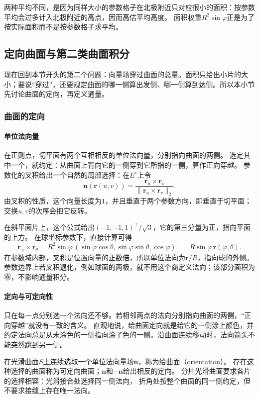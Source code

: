两种平均不同，是因为同样大小的参数格子在北极附近只对应很小的面积：按参数平均会过多计入北极附近的高点，因而高估平均高度。
面积权重$R^2\sin\varphi$正是为了按实际面积而不是按参数格子求平均。

\subsection{定向曲面与第二类曲面积分}

现在回到本节开头的第二个问题：向量场穿过曲面的总量。面积只给出小片的大小；要说“穿过”，还要规定曲面的哪一侧算出发侧、哪一侧算到达侧。所以本小节先讨论曲面的定向，再定义通量。

\subsubsection{曲面的定向}

\paragraph{单位法向量}

在正则点，切平面有两个互相相反的单位法向量，分别指向曲面的两侧。
选定其中一个，就约定：从曲面上背向它的一侧穿到它所指的一侧，算作正向穿越。
参数化的叉积给出一个自然的局部选择：在$E^\circ$上令
\[
 \bm n(\bm r(u,v))
 =\frac{\bm r_u\times\bm r_v}{\lVert\bm r_u\times\bm r_v\rVert_2}.
\]
由叉积的性质，这个向量长度为$1$，并且垂直于两个参数方向，即垂直于切平面；交换$u,v$的次序会把它反转。

在斜平面片上，这个公式给出$(-1,-1,1)^\top/\sqrt3$，它的第三分量为正，指向平面的上方。
在球坐标参数下，直接计算可得
\[
 \bm r_\varphi\times\bm r_\theta
 =R^2\sin\varphi\,(\sin\varphi\cos\theta,\sin\varphi\sin\theta,\cos\varphi)^\top
 =R\sin\varphi\,\bm r(\varphi,\theta).
\]
在参数域内部，叉积是位置向量的正数倍，所以单位法向为$\bm r/R$，指向球的外侧。
参数边界上若叉积退化，例如球面的两极，就不用这个商定义法向；该部分面积为零，不影响通量积分。

\paragraph{定向与可定向性}

只在每一点分别选一个法向还不够。若相邻两点的法向分别指向曲面的两侧，“正向穿越”就没有一致的含义。
直观地说，给曲面定向就是给它的一侧涂上颜色，并约定法向总是从未涂色的一侧指向涂了色的一侧。沿曲面连续移动时，法向箭头不能突然跳到另一侧。

\begin{definition}[曲面的定向]
\label{def:analysis-surface-orientation}
在光滑曲面$S$上连续选取一个单位法向量场$\bm n$，称为给曲面（orientation）。
存在这种选择的曲面称为可定向曲面；$\bm n$和$-\bm n$给出相反的定向。
分片光滑曲面要求各片的选择相容：光滑接合处选择同一侧法向，
折角处按整个曲面的同一侧约定，但不要求接缝上存在唯一法向。
\end{definition}

